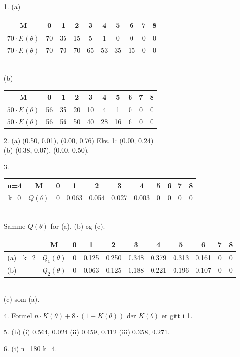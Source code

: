 \begin{itemize} \addtolength{\tabcolsep}{-0.3\tabcolsep}
\item[1.]  (a) \begin{tabular}[t]{c|ccccccccc}       
                     M    &   0 & 1 & 2 & 3 & 4 & 5 & 6 & 7 & 8 \\ \hline      
     $70\cdot K(\theta )$ &  70 & 35&15 & 5 & 1 & 0 & 0 & 0 & 0 \\      
     $70\cdot K(\theta )$ &  70 & 70&70 &65 & 53& 35& 15 & 0 & 0
             \end{tabular}\\
           (b) \begin{tabular}[t]{c|ccccccccc}       
                     M    &   0 & 1 & 2 & 3 & 4 & 5 & 6 & 7 & 8 \\ \hline      
     $50\cdot K(\theta )$ &  56 & 35&20 & 10 & 4 & 1 & 0 & 0 & 0 \\      
     $50\cdot K(\theta )$ &  56 & 56&50 &40 & 28& 16& 6 & 0 & 0
             \end{tabular}
 \item[2.]  (a) (0.50, 0.01), (0.00, 0.76)  Eks. 1: (0.00, 0.24)\\
              (b) (0.38, 0.07), (0.00, 0.50).
\item[3.]  \begin{tabular}{cc|ccccccccc}              
              n=4 &  M  &    0 & 1 & 2 & 3 & 4 & 5 & 6 & 7 & 8 \\ \hline      
              k=0 &$Q(\theta )$&0&0.063&0.054&0.027&0.003&0&0&0&0
             \end{tabular}\\
              Samme $Q(\theta)$ for (a), (b) og (c).\\[0.2cm]
           \begin{tabular}[t]{ccc|ccccccccc}  
              \addtolength{\tabcolsep}{-0.2\tabcolsep}            
             &   &  M  &    0 & 1 & 2 & 3 & 4 & 5 & 6 & 7 & 8 \\ \hline      
          (a)&k=2 &$Q_1(\theta )$&0&0.125&0.250&0.348&0.379&0.313&0.161&0&0\\
          (b)&    &$Q_2(\theta )$&0&0.063&0.125&0.188&0.221&0.196&0.107&0&0
          \end{tabular}\\
           (c) som (a).
         
\item[4.]  Formel $n\cdot K(\theta )+8\cdot (1-K(\theta ))$
           der $K(\theta )$ er gitt i 1.
\item[5.]  (b) (i) 0.564, 0.024  (ii) 0.459, 0.112  (iii) 0.358, 0.271.
\item[6.]  (i) n=180  k=4.
         


\end{itemize}
